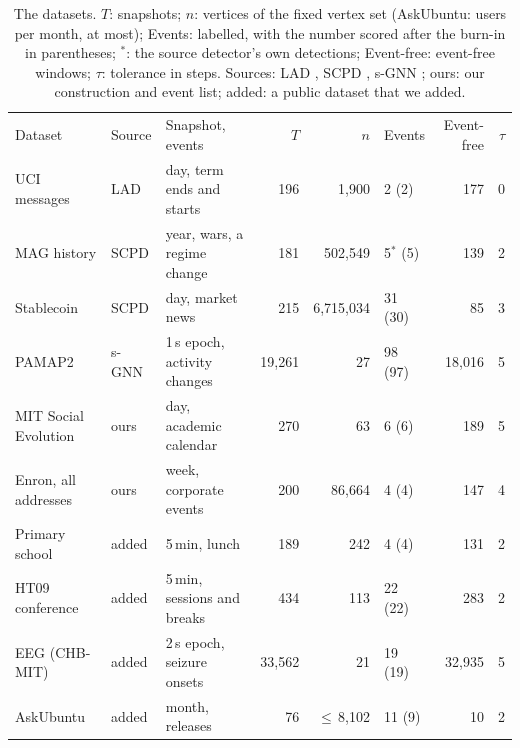 \documentclass[11pt]{article}
\let\dsmidrule\midrule
\renewcommand{\midrule}{\arrayrulecolor{dsrule}\dsmidrule\arrayrulecolor{dsnavy}}
\theoremstyle{dsplain}
\theoremstyle{definition}
\begin{document}
\begin{table}[ht]
  \centering
  \caption{The datasets. $T$: snapshots; $n$: vertices of the fixed vertex set (AskUbuntu: users per month, at most); 
  Events: labelled, with the number scored after the burn-in in parentheses; $^*$: the source detector's own detections;
  Event-free: event-free windows; $\tau$: tolerance in steps. Sources: LAD \citep{huang2020laplacian}, SCPD
  \citep{huang2023fast}, s-GNN \citep{sulem2023graph}; ours: our construction and event list; added: a public
  dataset that we added.}
  \label{tab:data}
  \footnotesize
  \setlength{\tabcolsep}{3.4pt}
  \begin{tabular}{lllrrlrr}
    \toprule
    Dataset & Source & Snapshot, events & $T$ & $n$ & Events & Event-free & $\tau$ \\
    \midrule
    UCI messages & LAD & day, term ends and starts & 196 & 1{,}900 & 2 (2) & 177 & 0 \\
    MAG history & SCPD & year, wars, a regime change & 181 & 502{,}549 & 5$^*$ (5) & 139 & 2 \\
    Stablecoin & SCPD & day, market news & 215 & 6{,}715{,}034 & 31 (30) & 85 & 3 \\
    PAMAP2 & s-GNN & 1\,s epoch, activity changes & 19{,}261 & 27 & 98 (97) & 18{,}016 & 5 \\
    MIT Social Evolution & ours & day, academic calendar & 270 & 63 & 6 (6) & 189 & 5 \\
    Enron, all addresses & ours & week, corporate events & 200 & 86{,}664 & 4 (4) & 147 & 4 \\
    Primary school & added & 5\,min, lunch & 189 & 242 & 4 (4) & 131 & 2 \\
    HT09 conference & added & 5\,min, sessions and breaks & 434 & 113 & 22 (22) & 283 & 2 \\
    EEG (CHB-MIT) & added & 2\,s epoch, seizure onsets & 33{,}562 & 21 & 19 (19) & 32{,}935 & 5 \\
    AskUbuntu & added & month, releases & 76 & $\le$\,8{,}102 & 11 (9) & 10 & 2 \\
    \bottomrule
  \end{tabular}
\end{table}
\end{document}
